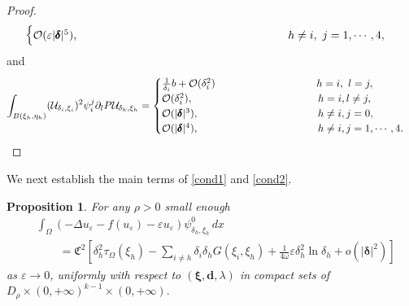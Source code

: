 \documentclass[11pt,a4paper]{amsart}
\newcommand{\e}{\varepsilon}
\renewcommand{\d }{\delta }
\newcommand{\Ui}{{\mathcal{U}_{\delta_i, \xi_i}}}
\newcommand{\Uh}{{\mathcal{U}_{\delta_h, \xi_h}}}
\newtheorem{proposition}[theorem]{Proposition}
\theoremstyle{definition}
\renewcommand{\(}{\left(}
\renewcommand{\)}{\right)}
\begin{document}
\begin{proof}
\begin{equation*}
\begin{cases}
\mathcal{O}(\e|\pmb \d|^5), \hspace{6.5 cm} h \neq i, \ j=1, \cdots, 4,
\end{cases}
\end{equation*}
and
\begin{equation*}
\int_{B(\xi_{h}, \eta_{h})} (\Ui)^{2} \psi^{j}_{i} \partial_{l} P\Uh =
\begin{cases}
\frac{1}{\d_i} b + \mathcal{O}(\d_i^2) 	\hspace{3.4 cm} h=i, \ l=j, \\
\mathcal{O}(\d_i^2), 	\hspace{4.2 cm}  h=i, l \neq j,\\
\mathcal{O}(|\pmb \d|^3),  	\hspace{4 cm}  h \neq i, j=0, \\
\mathcal{O}(|\pmb \d|^4), 	\hspace{4 cm}  h \neq i, j=1, \cdots, 4.
\end{cases}
\end{equation*}
\end{proof}
We next establish the main terms of \eqref{cond1} and \eqref{cond2}.\\
\begin{proposition}\label{espansione1}
For any $\rho>0$ small enough 
\begin{equation}\label{sys0}\begin{aligned}
&\int_\Omega \left(-\Delta u_\e -f(u_\e)-\e u_\e\right)\psi^0_{\d_h, \xi_h}\, dx\\ & \qquad=\mathfrak C^2\left[\delta_h^2\tau_\Omega(\xi_h)-\sum_{i\neq h}\d_i\d_h G(\xi_i, \xi_h)+\frac{1}{4\omega}\e \d_h^2\ln\d_h+o(|\pmb\d|^2)\right]\end{aligned}
\end{equation} as $\e \to 0$, uniformly  with respect to $(\boldsymbol\xi, \mathbf{d}, \lambda)$ in compact sets of $D_\rho \times (0, +\infty)^{k-1}\times (0, +\infty).$
\end{proposition}
\end{document}

